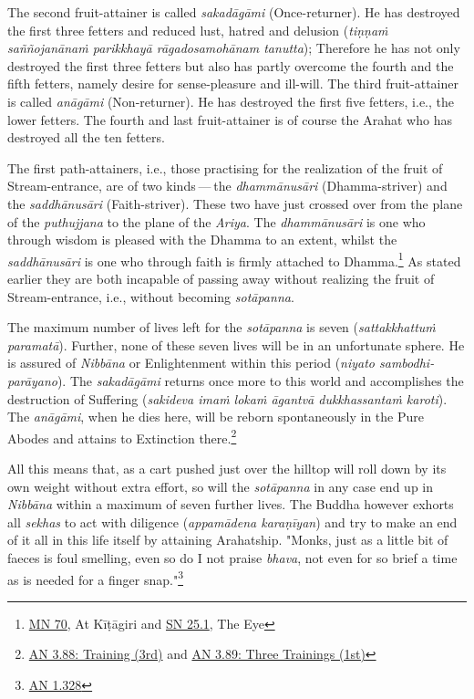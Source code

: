 The second fruit-attainer is
called \emph{sakadāgāmi} (Once-returner). He has destroyed the first three
fetters and reduced lust, hatred and delusion (\emph{tiṇṇaṁ saññojanānaṁ
parikkhayā rāgadosamohānam tanutta}); Therefore he has not only
destroyed the first three fetters but also has partly overcome the
fourth and the fifth fetters, namely desire for sense-pleasure and
ill-will. The third fruit-attainer is called \emph{anāgāmi} (Non-returner).
He has destroyed the first five fetters, i.e., the lower fetters. The
fourth and last fruit-attainer is of course the Arahat who has destroyed
all the ten fetters.


The first path-attainers, i.e., those practising for the realization of
the fruit of Stream-entrance, are of two kinds — the \emph{dhammānusāri}
(Dhamma-striver) and the \emph{saddhānusāri} (Faith-striver). These two have
just crossed over from the plane of the \emph{puthujjana} to the plane of the
\emph{Ariya}. The \emph{dhammānusāri} is one who through wisdom is pleased with
the Dhamma to an extent, whilst the \emph{saddhānusāri} is one who through
faith is firmly attached to Dhamma.\footnote{\href{https://suttacentral.net/mn70/en/bodhi}{MN 70}, At Kīṭāgiri and \href{https://suttacentral.net/sn25.1/en/sujato}{SN 25.1}, The Eye}
As stated earlier they are both incapable of passing away without realizing the fruit of
Stream-entrance, i.e., without becoming \emph{sotāpanna}.


The maximum number of lives left for the \emph{sotāpanna} is seven
(\emph{sattakkhattuṁ paramatā}). Further, none of these seven lives will be
in an unfortunate sphere. He is assured of \emph{Nibbāna} or Enlightenment
within this period (\emph{niyato sambodhi-parāyano}). The \emph{sakadāgāmi} returns
once more to this world and accomplishes the destruction of Suffering
(\emph{sakideva imaṁ lokaṁ āgantvā dukkhassantaṁ karoti}). The \emph{anāgāmi},
when he dies here, will be reborn spontaneously in the Pure Abodes and
attains to Extinction there.\footnote{\href{https://suttacentral.net/an3.88/en/sujato}{AN 3.88: Training (3rd)} and \href{https://suttacentral.net/an3.89/en/sujato}{AN 3.89: Three Trainings (1st)}}


All this means that, as a cart pushed just over the hilltop will roll
down by its own weight without extra effort, so will the \emph{sotāpanna} in
any case end up in \emph{Nibbāna} within a maximum of seven further lives.
The Buddha however exhorts all \emph{sekhas} to act with diligence
(\emph{appamādena karaṇīyan}) and try to make an end of it all in this life
itself by attaining Arahatship. "Monks, just as a little bit of faeces
is foul smelling, even so do I not praise \emph{bhava}, not even for so
brief a time as is needed for a finger snap."\footnote{\href{https://suttacentral.net/an1.316-332/en/sujato}{AN 1.328}}


